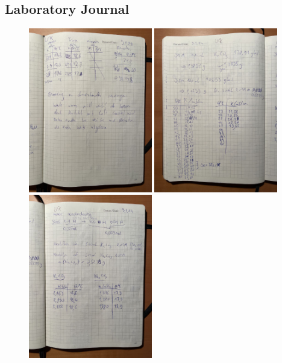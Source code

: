 \newpage

\subsection{Laboratory Journal}

\begin{figure}[H]
    \centering
    \includegraphics[width=0.48\textwidth]{figures/labjournal/lfk1.jpg} 
    \includegraphics[width=0.48\textwidth]{figures/labjournal/lfk2.jpg} 
    \includegraphics[width=0.48\textwidth]{figures/labjournal/lfk3.jpg} 

\end{figure}
